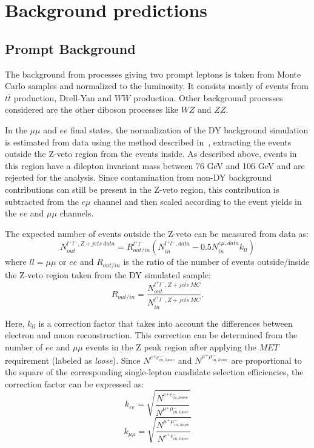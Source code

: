 \clearpage
\section{Background predictions}
\label{tW_background}

\subsection{Prompt Background}
\label{tW_DY_background}
The background from processes giving two prompt leptons is taken from Monte Carlo samples and normalized to the luminosity. It consists mostly of events from $t\bar{t}$ production, Drell-Yan and $WW$ production. Other background processes considered are the other diboson processes like $WZ$ and $ZZ$.

In the $\mu\mu$ and $ee$ final states, the normalization of the DY background simulation is estimated from data using the method described in~\cite{topPAS11_002,TOP-11-005_paper,TOP-12-007_paper,bib:TOP-15-003_paper}, extracting the events outside the Z-veto region from the events inside.
As described above, events in this region have a dilepton invariant mass between 76 GeV and 106 GeV and are rejected for the analysis.
Since contamination from non-DY background contributions can still be present in the Z-veto region, this contribution is subtracted from the $e\mu$ channel and then scaled according to the event yields in the $ee$ and $\mu\mu$ channels.

The expected number of events outside the Z-veto can be measured from data as:
$$N^{l^{+}l^{-}, Z+jets~data}_{out} = R^{l^{+}l^{-}}_{out/in}( N^{l^{+}l^{-},data}_{in} -0.5 N^{e\mu,data}_{in} k_{ll})$$
where $ll = \mu\mu$  or $ee$  and $R_{out/in}$ is the ratio of the number of events outside/inside the Z-veto region taken from the DY simulated sample:
$$R_{out/in}= \frac{N^{l^{+}l^{-},Z+jets~MC}_{out}}{N^{l^{+}l^{-},Z+jets~MC}_{in} }.$$

Here, $k_{ll}$ is a correction factor that takes into account the differences between electron and muon reconstruction.
This correction can be determined from the number of $ee$ and $\mu\mu$ events in the Z peak region after applying the $MET$ requirement (labeled as \textit{loose}).
Since $N^{e^+e^-_{in, loose}}$ and $N^{\mu^+\mu^-_{in, loose}}$ are proportional to the square of the corresponding single-lepton candidate selection efficiencies, the correction factor can be expressed as: $$k_{ee} = \sqrt{\frac{N^{e^+e^-_{in, loose}}}{N^{\mu^+\mu^-_{in, loose}}}}$$
$$k_{\mu\mu} = \sqrt{\frac{N^{\mu^+\mu^-_{in, loose}}}{N^{e^+e^-_{in, loose}}}}$$

